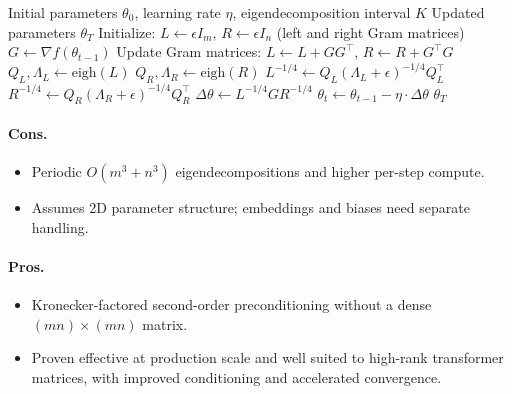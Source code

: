 \begin{algorithm}[H]
\caption{Shampoo (Matrix Preconditioning via Kronecker Products)}
\label{alg:shampoo}
\begin{algorithmic}[1]
\Require Initial parameters $\theta_0$, learning rate $\eta$, eigendecomposition interval $K$
\Ensure Updated parameters $\theta_T$
\State Initialize: $L \gets \epsilon I_m$, $R \gets \epsilon I_n$ (left and right Gram matrices)
    \State $G \gets \nabla f(\theta_{t-1})$ 
    \State Update Gram matrices: $L \gets L + G G^\top$, $R \gets R + G^\top G$
        \State $Q_L, \Lambda_L \gets \text{eigh}(L)$ 
        \State $Q_R, \Lambda_R \gets \text{eigh}(R)$ 
        \State $L^{-1/4} \gets Q_L (\Lambda_L + \epsilon)^{-1/4} Q_L^\top$
        \State $R^{-1/4} \gets Q_R (\Lambda_R + \epsilon)^{-1/4} Q_R^\top$
    \EndIf
    \State $\Delta \theta \gets L^{-1/4} G R^{-1/4}$ 
    \State $\theta_t \gets \theta_{t-1} - \eta \cdot \Delta \theta$
\EndFor
\Return $\theta_T$
\end{algorithmic}
\end{algorithm}

\paragraph{Cons.}
\begin{itemize}[leftmargin=*]
\item Periodic $O(m^3 + n^3)$ eigendecompositions and higher per-step compute.
\item Assumes 2D parameter structure; embeddings and biases need separate handling.
\end{itemize}

\paragraph{Pros.}
\begin{itemize}[leftmargin=*]
\item Kronecker-factored second-order preconditioning without a dense $(mn) \times (mn)$ matrix.
\item Proven effective at production scale and well suited to high-rank transformer matrices, with improved conditioning and accelerated convergence.
\end{itemize}

